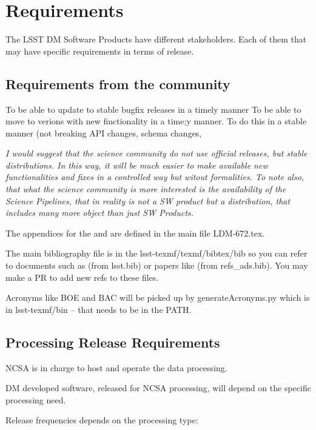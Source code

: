 \section{Requirements} \label{sec:reqs}

The LSST DM Software Products have different stakeholders.
Each of them that may have specific requirements in terms of release.


\subsection{Requirements from the community } \label{sec:comreqs}

To be able to update to stable bugfix releases in a timely manner
To be able to move to verions with new finctionality in a time;y manner.
To do this in a stable manner (not breaking API changes, schema changes,

\textit{ I would suggest that the science community do not use official releases, but stable distributions.
In this way, it will be much easier to make available new functionalities and fixes in a controlled way 
but witout formalities.
To note also, that what the science community is more interested is the availability of the Science Pipelines,
that in reality is not a SW product but a distribution, that includes many more object than just SW Products.  }

The appendices for the  and  are defined in the main file LDM-672.tex.

The main bibliography file is in the lsst-texmf/texmf/bibtex/bib so you can refer 
to documents such as  (from lsst.bib)  or papers like \cite{2008arXiv0805.2366I} (from refs\_ads.bib). You may make a PR to add new refs to these files.

Acronyms like BOE and BAC will be picked up by generateAcronyms.py which is in lsst-texmf/bin -- that needs to be in the PATH.


\subsection{Processing Release Requirements} \label{sec:procreqs}

NCSA is in charge to host and operate the data processing.

DM developed software, released for NCSA processing, will depend on the specific processing need.

Release frequencies depends on the processing type:

